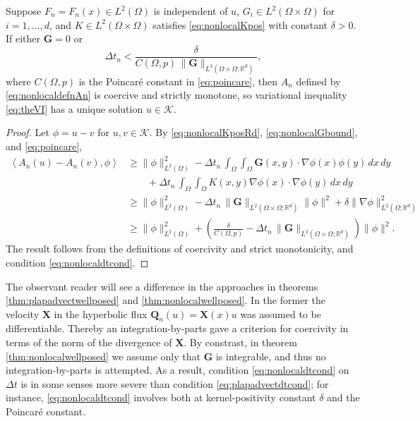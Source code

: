 \documentclass[final,leqno,onefignum,onetabnum]{siamltex1213bueler}
\newcommand\bG{\mathbf{G}}
\newcommand\bQ{\mathbf{Q}}
\newcommand\bX{\mathbf{X}}
\renewcommand{\grad}{\nabla}
\newcommand{\ip}[2]{\ensuremath{\left<#1,#2\right>}}
\newcommand\RR{\mathbb{R}}
\begin{document}
\begin{theorem}  \label{thm:nonlocalwellposed}  Suppose $F_n=F_n(x) \in L^2(\Omega)$ is independent of $u$, $G_i \in L^2(\Omega\times\Omega)$ for $i=1,\dots,d$, and $K \in L^2(\Omega\times\Omega)$ satisfies \eqref{eq:nonlocalKpos} with constant $\delta >0$.  If either $\bG=0$ or
\begin{equation}
  \Delta t_n < \frac{\delta}{C(\Omega,p)\, \|\bG\|_{L^2(\Omega\times\Omega;\RR^d)}},  \label{eq:nonlocaldtcond}
\end{equation}
where $C(\Omega,p)$ is the Poincar\'e constant in \eqref{eq:poincare}, then $A_n$ defined by \eqref{eq:nonlocaldefnAn} is coercive and strictly monotone, so variational inequality \eqref{eq:theVI} has a unique solution $u\in\mathcal{K}$.
\end{theorem}

\begin{proof}  Let $\phi=u-v$ for $u,v\in\mathcal{K}$.  By \eqref{eq:nonlocalKposRd}, \eqref{eq:nonlocalGbound}, and \eqref{eq:poincare},
\begin{align*}
\ip{A_n(u)-A_n(v)}{\phi} &\ge \|\phi\|_{L^2(\Omega)}^2 - \Delta t_n\,\int_\Omega \int_\Omega \bG(x,y) \cdot \grad \phi(x) \phi(y)\,dx\,dy \\
    &\qquad + \Delta t_n\,\int_\Omega \int_\Omega K(x,y) \grad \phi(x) \cdot \grad \phi(y)\,dx\,dy \\
    &\ge \|\phi\|_{L^2(\Omega)}^2 - \Delta t_n\,\|\bG\|_{L^2(\Omega\times\Omega;\RR^d)} \|\phi\|^2 + \delta \|\grad\phi\|_{L^2(\Omega;\RR^d)}^2 \\
    &\ge \|\phi\|_{L^2(\Omega)}^2 + \left(\frac{\delta}{C(\Omega,p)} - \Delta t_n\,\|\bG\|_{L^2(\Omega\times\Omega;\RR^d)}\right) \|\phi\|^2.
\end{align*}
The result follows from the definitions of coercivity and strict monotonicity, and condition \eqref{eq:nonlocaldtcond}.
\end{proof}

The observant reader will see a difference in the approaches in theorems \ref{thm:plapadvectwellposed} and \ref{thm:nonlocalwellposed}.  In the former the velocity $\bX$ in the hyperbolic flux $\bQ_n(u) = \bX(x) u$ was assumed to be differentiable.  Thereby an integration-by-parts gave a criterion for coercivity in terms of the norm of the divergence of $\bX$.  By constrast, in theorem \ref{thm:nonlocalwellposed} we assume only that $\bG$ is integrable, and thus no integration-by-parts is attempted.  As a result, condition \eqref{eq:nonlocaldtcond} on $\Delta t$ is in some senses more severe than condition \eqref{eq:plapadvectdtcond}; for instance, \eqref{eq:nonlocaldtcond} involves both at kernel-positivity constant $\delta$ and the Poincar\'e constant.
\end{document}
